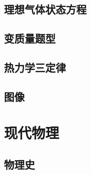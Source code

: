 \documentclass[cn,blue,11pt,normal]{elegantnote}
\begin{document}
\subsection{理想气体状态方程}
\begin{proset}
	
\end{proset}

\begin{proset}
	
\end{proset}

\subsection{变质量题型}
\begin{proset}
	
\end{proset}
\begin{proset}
	
\end{proset}
\subsection{热力学三定律}
\begin{proset}
	
\end{proset}

\subsection{图像}
\begin{proset}
	
\end{proset}


\newpage
\section{现代物理}
\subsection{物理史}
\begin{proset}
	
\end{proset}
\begin{proset}
	
\end{proset}
\begin{proset}
	
\end{proset}
\begin{proset}
	
\end{proset}
\begin{proset}
	
\end{proset}
\begin{proset}
	
\end{proset}
\end{document}
